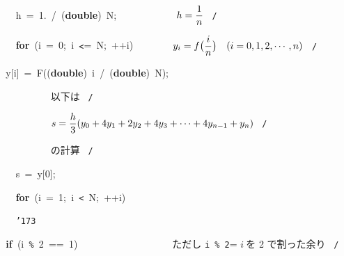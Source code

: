 \documentclass[a4paper,10pt]{article}
\def\mc{\relax}
\begin{document}
\noindent
\mbox{}\hfill

\noindent
\mbox{}{\tt\mc \ }{\tt\mc \ }{\tt\mc \ }{\tt\mc \ }h{\tt\mc \ }={\tt\mc \ }1.{\tt\mc \ }/{\tt\mc \ }(\textbf{double}){\tt\mc \ }N;{\tt\mc \ }{\tt\mc \ }{\tt\mc \ }{\tt\mc \ }{\tt\mc \ }{\tt\mc \ }{\tt\mc \ }{\tt\mc \ }{\tt\mc \ }{\tt\mc \ }\rm\mc {\tt /}{\tt *}\  \ $\displaystyle h={1\over n}$ \hfill \rm\mc \ {\tt *}{\tt /}
\tt\mc 

\noindent
\mbox{}{\tt\mc \ }{\tt\mc \ }{\tt\mc \ }{\tt\mc \ }\textbf{for}{\tt\mc \ }(i{\tt\mc \ }={\tt\mc \ }0;{\tt\mc \ }i{\tt\mc \ }{\tt <}={\tt\mc \ }N;{\tt\mc \ }++i){\tt\mc \ }{\tt\mc \ }{\tt\mc \ }{\tt\mc \ }{\tt\mc \ }{\tt\mc \ }\rm\mc {\tt /}{\tt *}\  \ $\displaystyle y_i=f\bigl({i\over n}\bigr)\quad (i=0, 1, 2, \cdots, n)$ \hfill \rm\mc \ {\tt *}{\tt /}
\tt\mc 

\noindent
\mbox{}{\tt\mc \ }{\tt\mc \ }y[i]{\tt\mc \ }={\tt\mc \ }F((\textbf{double}){\tt\mc \ }i{\tt\mc \ }/{\tt\mc \ }(\textbf{double}){\tt\mc \ }N);

\noindent
\mbox{}{\tt\mc \ }{\tt\mc \ }{\tt\mc \ }{\tt\mc \ }{\tt\mc \ }{\tt\mc \ }{\tt\mc \ }{\tt\mc \ }{\tt\mc \ }{\tt\mc \ }\rm\mc {\tt /}{\tt *}\  以下は \hfill \rm\mc \ {\tt *}{\tt /}
\tt\mc 

\noindent
\mbox{}{\tt\mc \ }{\tt\mc \ }{\tt\mc \ }{\tt\mc \ }{\tt\mc \ }{\tt\mc \ }{\tt\mc \ }{\tt\mc \ }{\tt\mc \ }{\tt\mc \ }\rm\mc {\tt /}{\tt *}\  $\displaystyle
             s={h\over3}(y_0+4y_1+2y_2+4y_3+
             \cdots +4y_{n-1}+y_n)$ \hfill \rm\mc \ {\tt *}{\tt /}
\tt\mc 

\noindent
\mbox{}{\tt\mc \ }{\tt\mc \ }{\tt\mc \ }{\tt\mc \ }{\tt\mc \ }{\tt\mc \ }{\tt\mc \ }{\tt\mc \ }{\tt\mc \ }{\tt\mc \ }\rm\mc {\tt /}{\tt *}\  の計算 \hfill \rm\mc \ {\tt *}{\tt /}
\tt\mc 

\noindent
\mbox{}{\tt\mc \ }{\tt\mc \ }{\tt\mc \ }{\tt\mc \ }s{\tt\mc \ }={\tt\mc \ }y[0];

\noindent
\mbox{}{\tt\mc \ }{\tt\mc \ }{\tt\mc \ }{\tt\mc \ }\textbf{for}{\tt\mc \ }(i{\tt\mc \ }={\tt\mc \ }1;{\tt\mc \ }i{\tt\mc \ }{\tt <}{\tt\mc \ }N;{\tt\mc \ }++i)

\noindent
\mbox{}{\tt\mc \ }{\tt\mc \ }{\tt\mc \ }{\tt\mc \ }{\tt\char'173}

\noindent
\mbox{}{\tt\mc \ }{\tt\mc \ }\textbf{if}{\tt\mc \ }(i{\tt\mc \ }{\tt\%}{\tt\mc \ }2{\tt\mc \ }=={\tt\mc \ }1){\tt\mc \ }{\tt\mc \ }{\tt\mc \ }{\tt\mc \ }{\tt\mc \ }{\tt\mc \ }{\tt\mc \ }{\tt\mc \ }{\tt\mc \ }{\tt\mc \ }{\tt\mc \ }{\tt\mc \ }{\tt\mc \ }{\tt\mc \ }{\tt\mc \ }{\tt\mc \ }{\tt\mc \ }\rm\mc {\tt /}{\tt *}\  \ ただし {\tt i \% 2}= $i\ $を 2 で割った余り \hfill \rm\mc \ {\tt *}{\tt /}
\tt\mc 
\end{document}
